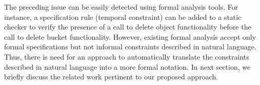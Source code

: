The preceding issue can be easily detected using formal analysis tools.
For instance, a specification rule (temporal constraint) can be added to a static checker to verify
the presence of a call to delete object functionality before the call to delete bucket functionality.
However, existing formal analysis accept only formal specifications but not informal constraints described in natural language.
Thus, there is need for an approach to automatically translate the constraints described in natural language into a more formal notation.
In next section, we briefly discuss the related work pertinent to our proposed approach.


 








